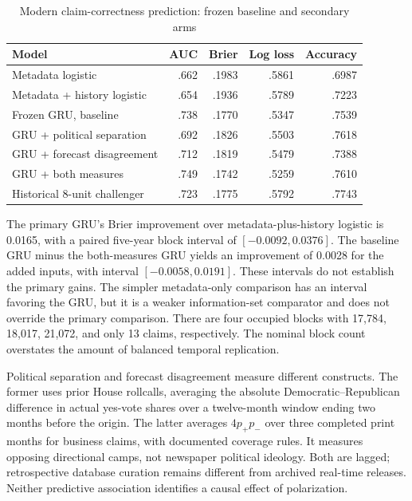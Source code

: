 \begin{table}[t]
\caption{Modern claim-correctness prediction: frozen baseline and secondary arms}\label{tab:modern}
\centering\small
\begin{tabularx}{\linewidth}{Xrrrr}
\toprule
Model & AUC & Brier & Log loss & Accuracy\\
\midrule
Metadata logistic & .662 & .1983 & .5861 & .6987\\
Metadata + history logistic & .654 & .1936 & .5789 & .7223\\
Frozen GRU, baseline & .738 & .1770 & .5347 & .7539\\
GRU + political separation & .692 & .1826 & .5503 & .7618\\
GRU + forecast disagreement & .712 & .1819 & .5479 & .7388\\
GRU + both measures & .749 & .1742 & .5259 & .7610\\
Historical 8-unit challenger & .723 & .1775 & .5792 & .7743\\
\bottomrule
\end{tabularx}
\end{table}

The primary GRU's Brier improvement over metadata-plus-history logistic is 0.0165, with a paired five-year block interval of $[-0.0092,0.0376]$. The baseline GRU minus the both-measures GRU yields an improvement of 0.0028 for the added inputs, with interval $[-0.0058,0.0191]$. These intervals do not establish the primary gains. The simpler metadata-only comparison has an interval favoring the GRU, but it is a weaker information-set comparator and does not override the primary comparison. There are four occupied blocks with 17,784, 18,017, 21,072, and only 13 claims, respectively. The nominal block count overstates the amount of balanced temporal replication.

Political separation and forecast disagreement measure different constructs. The former uses prior House rollcalls, averaging the absolute Democratic--Republican difference in actual yes-vote shares over a twelve-month window ending two months before the origin. The latter averages $4p_+p_-$ over three completed print months for business claims, with documented coverage rules. It measures opposing directional camps, not newspaper political ideology. Both are lagged; retrospective database curation remains different from archived real-time releases. Neither predictive association identifies a causal effect of polarization.

